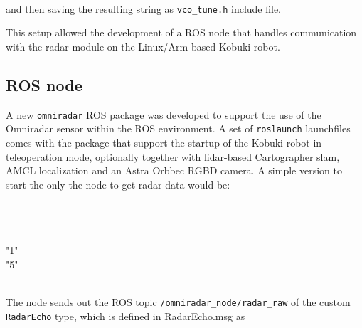 \begin{Shaded}
\begin{Highlighting}[]
\NormalTok{[ }    \\
\NormalTok{    }\NormalTok{ ]}
\end{Highlighting}
\end{Shaded}

and then saving the resulting string as \texttt{vco\_tune.h} include
file.

This setup allowed the development of a ROS node that handles
communication with the radar module on the Linux/Arm based Kobuki robot.

\subsection{ROS node}\label{ros-node}
A new \texttt{omniradar} ROS package was developed to support the use of
the Omniradar sensor within the ROS environment. A set of
\texttt{roslaunch} launchfiles comes with the package that support the
startup of the Kobuki robot in teleoperation mode, optionally together
with lidar-based Cartographer slam, AMCL localization and an Astra
Orbbec RGBD camera. A simple version to start the only the node to get
radar data would be:

\begin{Shaded}
\begin{Highlighting}[]
\\
    \\
\NormalTok{    }\NormalTok{>}\\
 "1"\NormalTok{ />}\\
  "5"\NormalTok{ />}\\
\\
\end{Highlighting}
\end{Shaded}

The node sends out the ROS topic \texttt{/omniradar\_node/radar\_raw} of
the custom \texttt{RadarEcho} type, which is defined in RadarEcho.msg as

